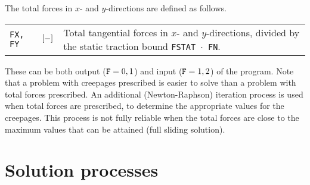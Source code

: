 \documentclass[12pt]{report}
\newenvironment{inputvars}{\vspace{0.4\baselineskip}%

\begin{tabular}{>{\raggedright}p{22mm}p{19mm}p{113mm}}}{
\end{tabular}

}
\newcommand{\inpvar}[3]{{\small\tt #1} & $#2$ & #3 \\[1ex]}
\begin{document}
The total forces in $x$- and $y$-directions are defined as follows.
\begin{inputvars}
\inpvar{FX, FY}{\bunit{-}}{Total tangential forces in $x$- and $y$-directions,
        divided by the static traction bound {\tt FSTAT $\cdot$ FN}.}
\end{inputvars}
These can be both output (${\tt F}=0,1$) and input (${\tt F}=1,2$) of the
program. Note that a problem with creepages prescribed is easier to solve
than a problem with total forces prescribed. An additional (Newton-Raphson)
iteration process is used when total forces are prescribed, to determine
the appropriate values for the creepages. This process is not fully
reliable when the total forces are close to the maximum values that can be
attained (full sliding solution).

\section{Solution processes}
\label{sec:solut_proc}
\label{sec:iter_const}
\end{document}
